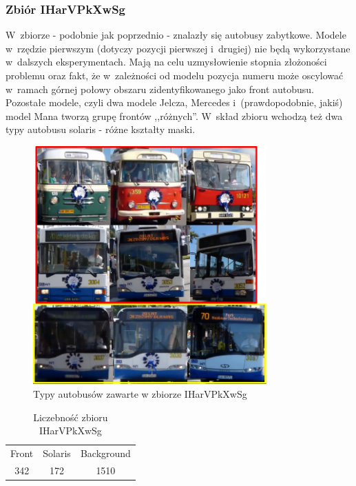 \subsubsection{Zbiór IHarVPkXwSg}

W~zbiorze - podobnie jak poprzednio - znalazły się autobusy zabytkowe.
Modele w~rzędzie pierwszym (dotyczy pozycji pierwszej i~drugiej) nie 
będą wykorzystane w~dalszych eksperymentach. Mają na celu uzmysłowienie
stopnia złożoności problemu oraz fakt, że w~zależności od modelu pozycja
numeru może oscylować w~ramach górnej połowy obszaru zidentyfikowanego
jako front autobusu. Pozostałe modele, czyli
dwa modele Jelcza, Mercedes i~(prawdopodobnie, jakiś) model Mana tworzą
grupę frontów ,,różnych''. W~skład zbioru wchodzą też dwa typy autobusu
solaris - różne kształty maski.

\begin{figure}[!h]
    \centering
    \includegraphics[width=0.8\textwidth]{img/exp_trainig_data_IHa}
    \caption{Typy autobusów zawarte w zbiorze IHarVPkXwSg}
    \label{fig:IHarVPkXwSg_types}
\end{figure}

\begin{table}[!h]
    \centering
    \begin{tabular}{c|c|c}
        Front   & Solaris   & Background \\
        342     & 172       & 1510
    \end{tabular}
    \caption{Liczebność zbioru IHarVPkXwSg}
    \label{tab:IHarVPkXwSg_count}
\end{table}

